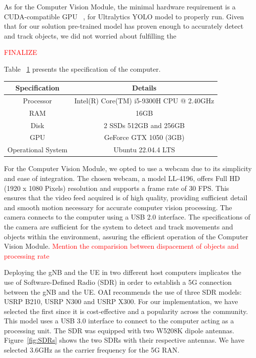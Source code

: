 As for the Computer Vision Module, the minimal hardware requirement is a CUDA-compatible GPU ~\cite{}, for Ultralytics YOLO model to properly run.
Given that for our solution pre-trained model has proven enough to accurately detect and track objects, we did not worried about fulfilling the

\textcolor{red}{FINALIZE}



Table ~\ref{tab:specs_pc} presents the specification of the computer.

\begin{table}[H]
    \begin{tabular}{|c|c|}
        \hline
        \textbf{Specification} & \textbf{Details} \\ \hline
        Processor                      &           Intel(R) Core(TM) i5-9300H CPU @ 2.40GHz   \\ \hline
        RAM                      &          16GB        \\ \hline
        Disk                      &   2 SSDs  512GB and 256GB         \\ \hline
        GPU                     &   GeForce GTX 1050 (3GB)      \\ \hline
        Operational System & Ubuntu 22.04.4 LTS                  \\ \hline
    \end{tabular}\label{tab:specs_pc}
\end{table}

For the Computer Vision Module, we opted to use a webcam due to its simplicity and ease of integration.
The chosen webcam, a model LL-4196, offers Full HD (1920 x 1080 Pixels) resolution and supports a frame rate of 30 FPS\@.
This ensures that the video feed acquired is of high quality, providing sufficient detail and smooth motion necessary for accurate computer vision processing.
The camera connects to the computer using a USB 2.0 interface.
The specifications of the camera are sufficient for the system to detect and track movements and objects within the environment, assuring the efficient operation of the Computer Vision Module.
\textcolor{red}{Mention the comparision between dispacement of objects and processing rate}

Deploying the gNB and the UE in two different host computers implicates the use of Software-Defined Radio (SDR) in order to establish a 5G connection between the gNB and the UE.
OAI recommends the use of three SDR models: USRP B210, USRP N300 and USRP X300\@ \cite{}. %
For our implementation, we have selected the first since it is cost-effective and a popularity across the community.
This model uses a USB 3.0 interface to connect to the computer acting as a processing unit.
The SDR was equipped with two W5208K dipole antennas.
Figure~\ref{fig:SDRs} shows the two SDRs with their respective antennas.
We have selected 3.6GHz as the carrier frequency for the 5G RAN\@.

